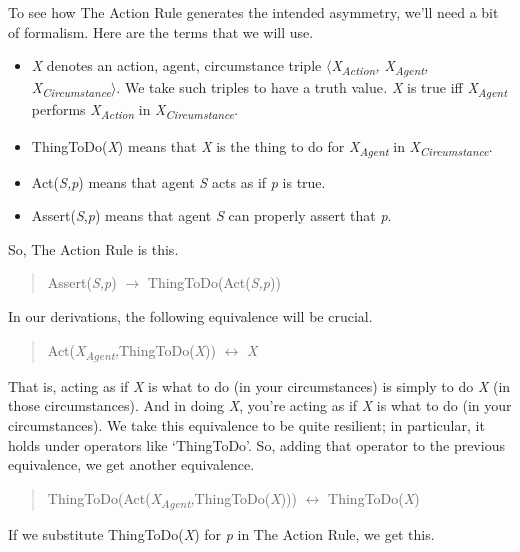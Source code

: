 \documentclass[
  11pt,
  letterpaper,
  DIV=11,
  numbers=noendperiod]{scrartcl}
\begin{document}
To see how The Action Rule generates the intended asymmetry, we'll need
a bit of formalism. Here are the terms that we will use.

\begin{itemize}
\item
  \emph{X} denotes an action, agent, circumstance triple
  \(\langle\)\emph{X\textsubscript{Action}, X\textsubscript{Agent},
  X\textsubscript{Circumstance}}\(\rangle\). We take such triples to
  have a truth value\emph{.} \emph{X} is true iff
  \emph{X\textsubscript{Agent}} performs \emph{X\textsubscript{Action}}
  in \emph{X\textsubscript{Circumstance}}.
\item
  ThingToDo(\emph{X}) means that \emph{X} is the thing to do for
  \emph{X\textsubscript{Agent}} in \emph{X\textsubscript{Circumstance}}.
\item
  Act(\emph{S,p}) means that agent \emph{S} acts as if \emph{p} is true.
\item
  Assert(\emph{S},\emph{p}) means that agent \emph{S} can properly
  assert that \emph{p}.
\end{itemize}

So, The Action Rule is this.

\begin{quote}
Assert(\emph{S,p}) \({\rightarrow}\) ThingToDo(Act(\emph{S,p}))
\end{quote}

In our derivations, the following equivalence will be crucial.

\begin{quote}
Act(\emph{X\textsubscript{Agent},}ThingToDo(\emph{X}))
\({\leftrightarrow}\) \emph{X}
\end{quote}

That is, acting as if \emph{X} is what to do (in your circumstances) is
simply to do \emph{X} (in those circumstances). And in doing \emph{X},
you're acting as if \emph{X} is what to do (in your circumstances). We
take this equivalence to be quite resilient; in particular, it holds
under operators like `ThingToDo'. So, adding that operator to the
previous equivalence, we get another equivalence.

\begin{quote}
ThingToDo(Act(\emph{X\textsubscript{Agent},}ThingToDo(\emph{X})))
\({\leftrightarrow}\) ThingToDo(\emph{X})
\end{quote}

If we substitute ThingToDo(\emph{X}) for \emph{p} in The Action Rule, we
get this.
\end{document}
